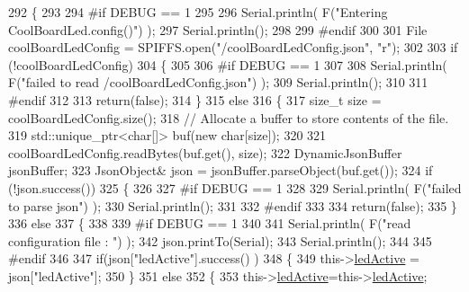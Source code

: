 \begin{DoxyCode}
292 \{
293 
294 \textcolor{preprocessor}{#if DEBUG == 1 }
295         
296     Serial.println( F(\textcolor{stringliteral}{"Entering CoolBoardLed.config()"}) );
297     Serial.println();
298 
299 \textcolor{preprocessor}{#endif}
300     
301     File coolBoardLedConfig = SPIFFS.open(\textcolor{stringliteral}{"/coolBoardLedConfig.json"}, \textcolor{stringliteral}{"r"});
302 
303     \textcolor{keywordflow}{if} (!coolBoardLedConfig) 
304     \{
305     
306 \textcolor{preprocessor}{    #if DEBUG == 1}
307 
308         Serial.println( F(\textcolor{stringliteral}{"failed to read /coolBoardLedConfig.json"}) );
309         Serial.println();
310 
311 \textcolor{preprocessor}{    #endif}
312 
313         \textcolor{keywordflow}{return}(\textcolor{keyword}{false});
314     \}
315     \textcolor{keywordflow}{else}
316     \{
317         \textcolor{keywordtype}{size\_t} size = coolBoardLedConfig.size();
318         \textcolor{comment}{// Allocate a buffer to store contents of the file.}
319         std::unique\_ptr<char[]> buf(\textcolor{keyword}{new} \textcolor{keywordtype}{char}[size]);
320 
321         coolBoardLedConfig.readBytes(buf.get(), size);
322         DynamicJsonBuffer jsonBuffer;
323         JsonObject& json = jsonBuffer.parseObject(buf.get());
324         \textcolor{keywordflow}{if} (!json.success()) 
325         \{
326         
327 \textcolor{preprocessor}{        #if DEBUG == 1}
328 
329             Serial.println( F(\textcolor{stringliteral}{"failed to parse json"}) );
330             Serial.println();
331         
332 \textcolor{preprocessor}{        #endif}
333 
334             \textcolor{keywordflow}{return}(\textcolor{keyword}{false});
335         \} 
336         \textcolor{keywordflow}{else}
337         \{
338         
339 \textcolor{preprocessor}{        #if DEBUG == 1}
340     
341             Serial.println( F(\textcolor{stringliteral}{"read configuration file : "}) );
342             json.printTo(Serial);
343             Serial.println();
344         
345 \textcolor{preprocessor}{        #endif}
346   
347             \textcolor{keywordflow}{if}(json[\textcolor{stringliteral}{"ledActive"}].success() )
348             \{
349                 this->\hyperlink{classCoolBoardLed_a5f17c135516fcf4b44ea8a096ba0177a}{ledActive} = json[\textcolor{stringliteral}{"ledActive"}]; 
350             \}
351             \textcolor{keywordflow}{else}
352             \{
353                 this->\hyperlink{classCoolBoardLed_a5f17c135516fcf4b44ea8a096ba0177a}{ledActive}=this->\hyperlink{classCoolBoardLed_a5f17c135516fcf4b44ea8a096ba0177a}{ledActive};          

\end{DoxyCode}
